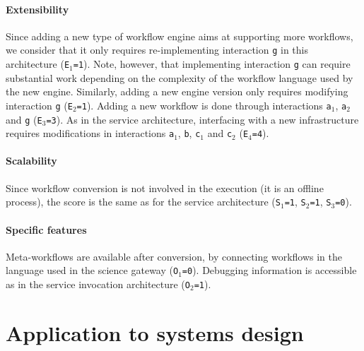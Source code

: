 \documentclass[preprint,3p,twocolumn]{elsarticle}
\newcommand{\correction}[1]{\color{blue}#1\color{black}\xspace}
\begin{document}
\paragraph{Extensibility} Since adding a new type of workflow engine
aims at supporting more workflows, we consider that it only requires
re-implementing interaction \texttt{g} in this architecture  (\texttt{E$_1$=1}). Note,
however, that implementing interaction \texttt{g} can require
substantial work depending on the complexity of the workflow language used by
the new engine. Similarly, adding a
new engine version only requires modifying interaction \texttt{g}
(\texttt{E$_2$=1}).  Adding a new workflow is done through
interactions \texttt{a$_1$}, \texttt{a$_2$} and \texttt{g} (\texttt{E$_3$=3}). As in the
service architecture, interfacing with a new infrastructure requires
modifications in interactions \texttt{a$_1$}, \texttt{b}, \texttt{c$_1$}
and \texttt{c$_2$} (\texttt{E$_4$=4}).

\paragraph{Scalability}  Since workflow conversion is not involved in
the execution (it is an offline process), the score is the same as for the
service architecture (\texttt{S$_1$=1},
\texttt{S$_2$=1}, \texttt{S$_3$=0}).

\paragraph{Specific features} Meta-workflows are available after
conversion, by connecting workflows in the language used in the
science gateway (\texttt{O$_1$=0}).  Debugging information is accessible
as in the service invocation architecture (\texttt{O$_2$=1}).

\correction{\section{Application to systems design}}
\label{sec:application}
\end{document}
